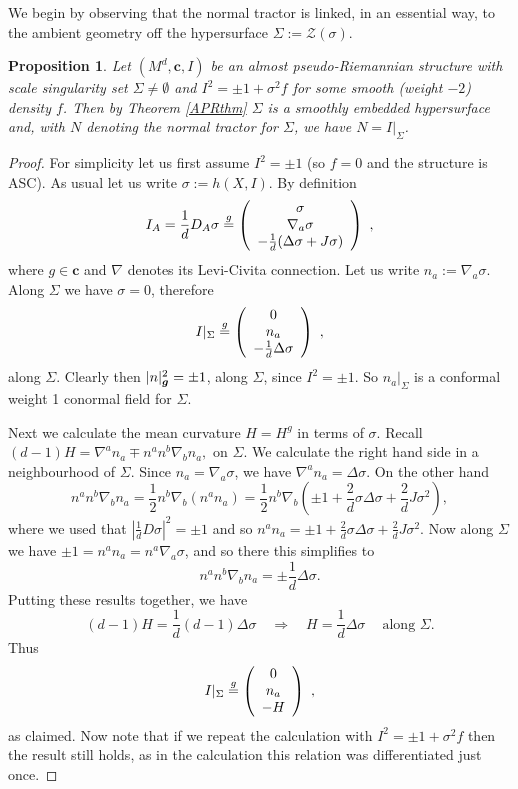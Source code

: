\documentclass[a4paper,12pt]{amsart}
\newcommand{\cZ}{\mathcal{Z}}
\newcommand{\cc}{\boldsymbol{c}}
\newcommand{\si}{\sigma}
\newtheorem{proposition}[theorem]{Proposition}
\theoremstyle{remark}
\newcommand{\nd}{\nabla}
\begin{document}
We begin by observing that the normal tractor is linked, in an essential way, to the ambient geometry off the hypersurface $\Sigma:= \cZ(\si)$.
\begin{proposition}\label{ascN}
Let $(M^d,\cc,I)$ be an almost pseudo-Riemannian 
structure with scale singularity set $\Sigma\neq \emptyset$ and
$I^2=\pm 1 + \si^2 f$ for some smooth (weight $-2$) density $f$. Then by Theorem \ref{APRthm} $\Sigma$ is a smoothly embedded hypersurface and, with $N$ denoting the normal tractor for $\Sigma$, we
have $N=I|_\Sigma$.
\end{proposition}
\begin{proof}
For simplicity let us first assume $I^2=\pm 1$ (so $f=0$  and the structure is ASC). 
As usual let us write $\si:=h(X,I)$.  By definition 
$$
I_A=\frac{1}{d}D_A\si\stackrel{g}{=} 
\left(\begin{array}{c} 
\si \cr  \nabla_a \si\cr -\frac{1}{d}(\Delta \si +J \si) 
\end{array}\right) ~,
$$ 
where $g\in \cc$ and $\nabla$ denotes its Levi-Civita connection. 
 Let us write $n_a := \nabla_a \si$.  Along
$\Sigma$ we have $\si=0$, therefore 
 $$
I|_\Sigma  \stackrel{g}{=} \left(\begin{array}{c}
 0 \cr  n_a \cr
 - \frac{1}{d}\Delta \si \end{array}\right)  ~,
$$ along $\Sigma$. Clearly then $|n|^2_{\mbox{\boldmath{\scriptsize$ g$}}}=\pm 1$, along $\Sigma$, since $I^2=\pm 1$. So $n_a|_\Sigma$ is a conformal weight 1 conormal field for $\Sigma$.

Next we calculate the mean curvature $H=H^g$ in terms of $\si$.  Recall $
(d-1)H=\nd^an_a \mp n^an^b\nd_b n_a , $ on $\Sigma$. 
 We calculate the right hand side in
a neighbourhood of $\Sigma$. Since $n_a=\nabla_a\si$, we have
$\nd^a n_a=\Delta \si$. On the other hand
$$
n^an^b\nd_b n_a=\frac{1}{2}n^b\nd_b
(n^an_a)=\frac{1}{2} n^b\nd_b(\pm 1+\frac{2}{d}\si\Delta \si +\frac{2}{d}J\si^2),
$$
where we used that $|\frac{1}{d}D \si|^2=\pm 1$ and so $n^an_a=\pm 1+\frac{2}{d}\si\Delta \si +\frac{2}{d}J\si^2 $.
Now along $\Sigma $ we have $\pm 1=n^an_a=n^a\nd_a \si$, and so there this simplifies to 
$$
n^an^b\nd_b n_a=\pm \frac{1}{d}\Delta \si.
$$
Putting these results together, we have
$$
(d-1)H= \frac{1}{d}(d-1)\Delta \si\quad \Rightarrow \quad H=\frac{1}{d}\Delta \si~ \quad \mbox{along } \Sigma .
$$
Thus 
$$
I|_\Sigma  \stackrel{g}{=} \left(\begin{array}{c}
0 \cr  n_a \cr
 -H \end{array}\right) ~,
$$ as claimed. Now note that if we repeat the calculation with $I^2=\pm 1 + \si^2 f$ then the result still holds, as in the calculation this relation was differentiated just once. 
\end{proof}
\end{document}
